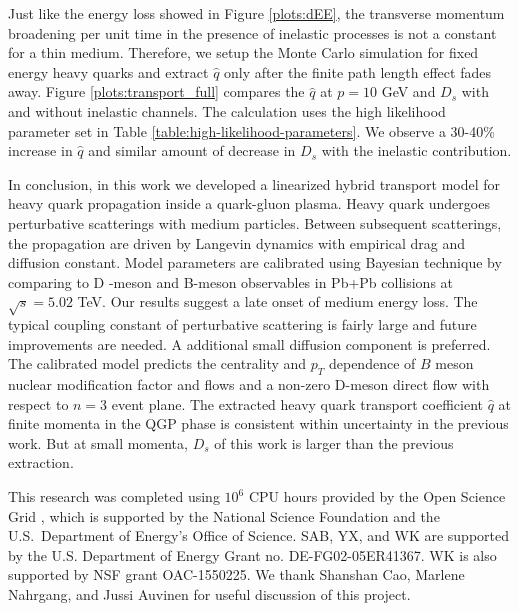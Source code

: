 \documentclass[aps, prc, reprint, amsmath, groupedaddress, nofootinbib]{revtex4-1}
\begin{document}
Just like the energy loss showed in Figure \ref{plots:dEE}, the transverse momentum broadening per unit time in the presence of inelastic processes is not a constant for a thin medium.
Therefore, we setup the Monte Carlo simulation for fixed energy heavy quarks and extract $\hat{q}$ only after the finite path length effect fades away. 
Figure \ref{plots:transport_full} compares the $\hat{q}$ at $p=10$ GeV and $D_s$ with and without inelastic channels.
The calculation uses the high likelihood parameter set in Table \ref{table:high-likelihood-parameters}. 
We observe a 30-40\% increase in $\hat{q}$ and similar amount of decrease in $D_s$ with the inelastic contribution.

In conclusion, in this work we developed a linearized hybrid transport model for heavy quark propagation inside a quark-gluon plasma.
Heavy quark undergoes perturbative scatterings with medium particles. Between subsequent scatterings, the propagation are driven by Langevin dynamics with empirical drag and diffusion constant.
Model parameters are calibrated using Bayesian technique by comparing to D -meson and B-meson observables in Pb+Pb collisions at $\sqrt{s}=5.02$ TeV.
Our results suggest a late onset of medium energy loss.
The typical coupling constant of perturbative scattering is fairly large and future improvements are needed.
A additional small diffusion component is preferred.
The calibrated model predicts the centrality and $p_T$ dependence of $B$ meson nuclear modification factor and flows and a non-zero D-meson direct flow with respect to $n=3$ event plane.
The extracted heavy quark transport coefficient $\hat{q}$ at finite momenta in the QGP phase is consistent within uncertainty in the previous work. 
But at small momenta, $D_s$ of this work is larger than the previous extraction.

\begin{acknowledgments}
  This research was completed using $10^6$ CPU hours provided by the Open Science Grid \cite{Pordes:2007zzb,Sfiligoi:2010zz}, which is supported by the National Science Foundation and the U.S.\ Department of Energy's Office of Science.
SAB, YX, and WK  are supported by the U.S. Department of Energy Grant no. DE-FG02-05ER41367.
 WK is also supported by NSF grant OAC-1550225.
We thank Shanshan Cao, Marlene Nahrgang, and Jussi Auvinen for useful discussion of this project.
\end{acknowledgments}
\end{document}
